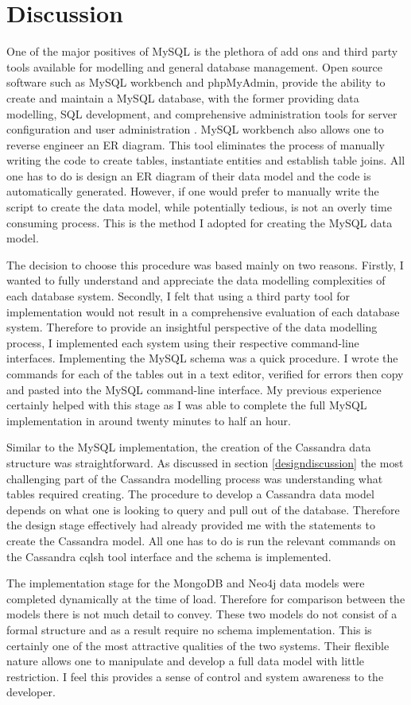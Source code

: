 \section{Discussion}\label{schemadiscussion}
One of the major positives of MySQL is the plethora of add ons and third party tools available for modelling and general database management. Open source software such as MySQL workbench and phpMyAdmin, provide the ability to create and maintain a MySQL database, with the former providing data modelling, SQL development, and comprehensive administration tools for server configuration and user administration \cite{mysqlworkbench}. MySQL workbench also allows one to reverse engineer an ER diagram. This tool eliminates the process of manually writing the code to create tables, instantiate entities and establish table joins. All one has to do is design an ER diagram of their data model and the code is automatically generated. However, if one would prefer to manually write the script to create the data model, while potentially tedious, is not an overly time consuming process. This is the method I adopted for creating the MySQL data model.

The decision to choose this procedure was based mainly on two reasons. Firstly, I wanted to fully understand and appreciate the data modelling complexities of each database system. Secondly, I felt that using a third party tool for implementation would not result in a comprehensive evaluation of each database system. Therefore to provide an insightful perspective of the data modelling process, I implemented each system using their respective command-line interfaces. Implementing the MySQL schema was a quick procedure. I wrote the commands for each of the tables out in a text editor, verified for errors then copy and pasted into the MySQL command-line interface. My previous experience certainly helped with this stage as I was able to complete the full MySQL implementation in around twenty minutes to half an hour. 

Similar to the MySQL implementation, the creation of the Cassandra data structure was straightforward. As discussed in section \ref{designdiscussion} the most challenging part of the Cassandra modelling process was understanding what tables required creating. The procedure to develop a Cassandra data model depends on what one is looking to query and pull out of the database. Therefore the design stage effectively had already provided me with the statements to create the Cassandra model. All one has to do is run the relevant commands on the Cassandra cqlsh tool interface and the schema is implemented.

The implementation stage for the MongoDB and Neo4j data models were completed dynamically at the time of load. Therefore for comparison between the models there is not much detail to convey. These two models do not consist of a formal structure and as a result require no schema implementation. This is certainly one of the most attractive qualities of the two systems. Their flexible nature allows one to manipulate and develop a full data model with little restriction. I feel this provides a sense of control and system awareness to the developer.


